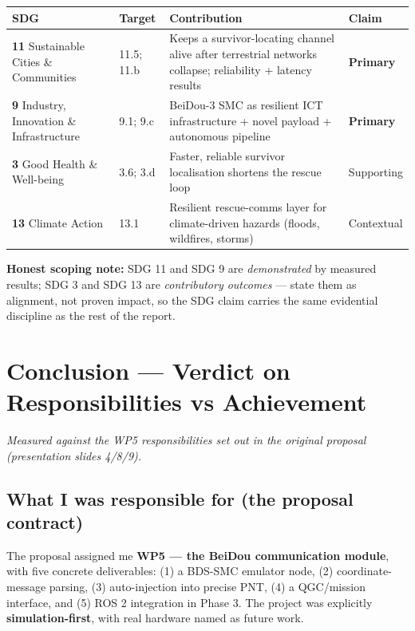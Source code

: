 \documentclass[11pt,a4paper]{article}
\begin{document}
\begin{longtable}{@{}p{3.4cm} p{2.6cm} p{6.2cm} p{2.0cm}@{}}
\toprule
\textbf{SDG} & \textbf{Target} & \textbf{Contribution} & \textbf{Claim} \\
\midrule
\endhead
\textbf{11} Sustainable Cities \& Communities & 11.5; 11.b & Keeps a survivor-locating channel alive after terrestrial networks collapse; reliability + latency results & \textbf{Primary} \\
\textbf{9} Industry, Innovation \& Infrastructure & 9.1; 9.c & BeiDou-3 SMC as resilient ICT infrastructure + novel payload + autonomous pipeline & \textbf{Primary} \\
\textbf{3} Good Health \& Well-being & 3.6; 3.d & Faster, reliable survivor localisation shortens the rescue loop & Supporting \\
\textbf{13} Climate Action & 13.1 & Resilient rescue-comms layer for climate-driven hazards (floods, wildfires, storms) & Contextual \\
\bottomrule
\end{longtable}

\textbf{Honest scoping note:} SDG 11 and SDG 9 are \emph{demonstrated} by measured results;
SDG 3 and SDG 13 are \emph{contributory outcomes} --- state them as alignment, not proven
impact, so the SDG claim carries the same evidential discipline as the rest of the report.

\section{Conclusion --- Verdict on Responsibilities vs Achievement}

\emph{Measured against the WP5 responsibilities set out in the original proposal
(presentation slides 4/8/9).}

\subsection{What I was responsible for (the proposal contract)}
The proposal assigned me \textbf{WP5 --- the BeiDou communication module}, with five concrete
deliverables: (1) a BDS-SMC emulator node, (2) coordinate-message parsing, (3) auto-injection
into precise PNT, (4) a QGC/mission interface, and (5) ROS 2 integration in Phase 3. The
project was explicitly \textbf{simulation-first}, with real hardware named as future work.
\end{document}
